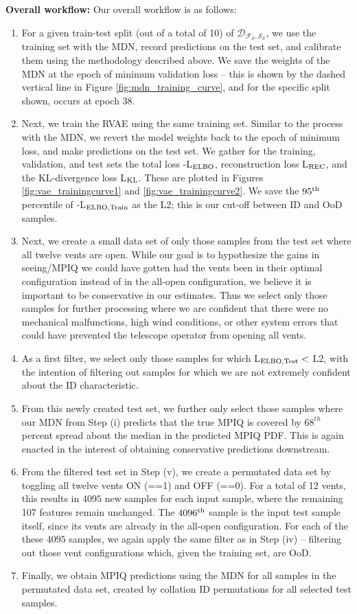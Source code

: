 {\bf Overall workflow:} Our overall workflow is as follows:
\begin{enumerate}
    \item For a given train-test split (out of a total of 10) of $\mathcal{D_{F_S,S_S}}$, we use the training set with the MDN, record predictions on the test set, and calibrate them using the methodology described above. We save the weights of the MDN at the epoch of minimum validation loss -- this is shown by the dashed vertical line in Figure \ref{fig:mdn_training_curve}, and for the specific split shown, occurs at epoch 38.
    \item Next, we train the RVAE using the same training set. Similar to the process with the MDN, we revert the model weights back to the epoch of minimum loss, and make predictions on the test set. We gather for the training, validation, and test sets the total loss -L$_{\rm ELBO}$, reconstruction loss L$_{\rm REC}$, and the KL-divergence loss L$_{\rm KL}$. These are plotted in Figures \ref{fig:vae_trainingcurve1} and \ref{fig:vae_trainingcurve2}. We save the $95^{\rm th}$ percentile of -L$_{\rm ELBO, Train}$ as the L2; this is our cut-off between ID and OoD samples. 
    \item Next, we create a small data set of only those samples from the test set where all twelve vents are open. While our goal is to hypothesize the gains in seeing/MPIQ we could have gotten had the vents been in their optimal configuration instead of in the all-open configuration, we believe it is important to be conservative in our estimates. Thus we select only those samples for further processing where we are confident that there were no mechanical malfunctions, high wind conditions, or other system errors that could have prevented the telescope operator from opening all vents.
    \item As a first filter, we select only those samples for which L$_{\rm ELBO, Test} <$ L2, with the intention of filtering out samples for which we are not extremely confident about the ID characteristic.
    \item From this newly created test set, we further only select those samples where our MDN from Step (i) predicts that the true MPIQ is covered by $68^{th}$ percent spread about the median in the predicted MPIQ PDF. This is again enacted in the interest of obtaining conservative predictions downstream.
    \item From the filtered test set in Step (v), we create a permutated data set by toggling all twelve vents ON (==1) and OFF (==0). For a total of 12 vents, this results in $4095$ new samples for each input sample, where the remaining 107 features remain unchanged. The $4096^{\rm th}$ sample is the input test sample itself, since its vents are already in the all-open configuration. For each of the these $4095$ samples, we again apply the same filter as in Step (iv) -- filtering out those vent configurations which, given the training set, are OoD.
    \item Finally, we obtain MPIQ predictions using the MDN for all samples in the permutated data set, created by collation ID permutations for all selected test samples.
\end{enumerate}

